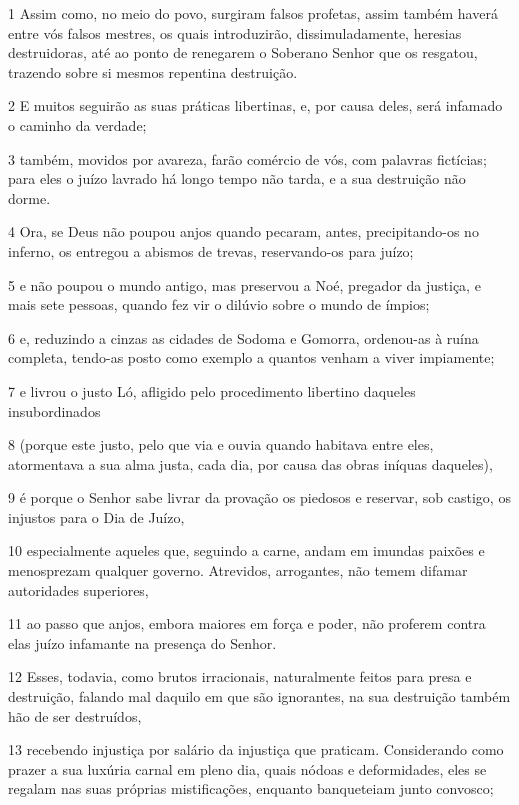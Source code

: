\par 1 Assim como, no meio do povo, surgiram falsos profetas, assim também haverá entre vós falsos mestres, os quais introduzirão, dissimuladamente, heresias destruidoras, até ao ponto de renegarem o Soberano Senhor que os resgatou, trazendo sobre si mesmos repentina destruição.
\par 2 E muitos seguirão as suas práticas libertinas, e, por causa deles, será infamado o caminho da verdade;
\par 3 também, movidos por avareza, farão comércio de vós, com palavras fictícias; para eles o juízo lavrado há longo tempo não tarda, e a sua destruição não dorme.
\par 4 Ora, se Deus não poupou anjos quando pecaram, antes, precipitando-os no inferno, os entregou a abismos de trevas, reservando-os para juízo;
\par 5 e não poupou o mundo antigo, mas preservou a Noé, pregador da justiça, e mais sete pessoas, quando fez vir o dilúvio sobre o mundo de ímpios;
\par 6 e, reduzindo a cinzas as cidades de Sodoma e Gomorra, ordenou-as à ruína completa, tendo-as posto como exemplo a quantos venham a viver impiamente;
\par 7 e livrou o justo Ló, afligido pelo procedimento libertino daqueles insubordinados
\par 8 (porque este justo, pelo que via e ouvia quando habitava entre eles, atormentava a sua alma justa, cada dia, por causa das obras iníquas daqueles),
\par 9 é porque o Senhor sabe livrar da provação os piedosos e reservar, sob castigo, os injustos para o Dia de Juízo,
\par 10 especialmente aqueles que, seguindo a carne, andam em imundas paixões e menosprezam qualquer governo. Atrevidos, arrogantes, não temem difamar autoridades superiores,
\par 11 ao passo que anjos, embora maiores em força e poder, não proferem contra elas juízo infamante na presença do Senhor.
\par 12 Esses, todavia, como brutos irracionais, naturalmente feitos para presa e destruição, falando mal daquilo em que são ignorantes, na sua destruição também hão de ser destruídos,
\par 13 recebendo injustiça por salário da injustiça que praticam. Considerando como prazer a sua luxúria carnal em pleno dia, quais nódoas e deformidades, eles se regalam nas suas próprias mistificações, enquanto banqueteiam junto convosco;
